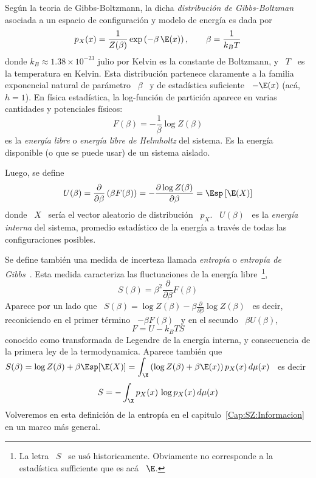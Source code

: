 \begin{ejemplo}
  Seg\'un  la  teoria  de  Gibbs-Boltzmann,  la  dicha  {\em  distribuci\'on  de
    Gibbs-Boltzman}  asociada  a  un  espacio  de configuraci\'on  y  modelo  de
  energ\'ia es dada por
  \[
  p_X(x) = \frac{1}{Z(\beta)} \exp\left( -  \beta \, \E(x) \right), \qquad \beta
  = \frac{1}{k_B T}
  \]
  donde $k_B \approx  1.38 \times 10^{-23}$ julio por Kelvin  es la constante de
  Boltzmann,  y  \ $T$  \  es la  temperatura  en  Kelvin.  Esta  distribuci\'on
  partenece claramente a la familia exponencial natural de par\'ametro \ $\beta$
  \ y  de estad\'istica  suficiente \  $-\E(x)$ (ac\'a, $h  = 1$).   En f\'isica
  estad\'istica, la log-funci\'on de  partici\'on aparece en varias cantidades y
  potenciales f\'isicos:
  \[
  F(\beta) = - \frac{1}{\beta} \log Z(\beta)
  \]
  es  la  {\em  energ\'ia  libre}  o  {\em energ\'ia  libre  de  Helmholtz}  del
  sistema.  Es la  energ\'ia disponible  (o  que se  puede usar)  de un  sistema
  aislado.

  Luego, se define
  \[
  U(\beta) =  \frac{\partial}{\partial \beta} \left( \beta F(\beta)  \right) = -
  \frac{\partial \log Z(\beta)}{\partial \beta} = \Esp\left[ \E(X) \right]
  \]
  donde  \ $X$  \ ser\'ia  el  vector aleatorio  de distribuci\'on  \ $p_X$.   \
  $U(\beta)$ \ es la {\em energ\'ia interna} del sistema, promedio estad\'istico
  de la energ\'ia a trav\'es de todas las configuraciones posibles.

  Se define  tambi\'en una medida de  incerteza llamada {\em  entrop\'ia} o {\em
    entrop\'ia  de  Gibbs}~\cite{Bol77, Bol96,  Bol98,  Gib02, Jay65,  LanLif80,
    MezMon09, Mer10,  Mer18}.  Esta medida  caracteriza las fluctuaciones  de la
  energ\'ia libre~\footnote{La letra \ $S$ \ se us\'o historicamente. Obviamente
    no corresponde a la estad\'istica sufficiente que es ac\'a \ $\E$.},
  \[
  S(\beta) = \beta^2 \frac{\partial}{\partial \beta} F(\beta)
  \]
  Aparece   por   un  lado   que   \  $S(\beta)   =   \log   Z(\beta)  -   \beta
  \frac{\partial}{\partial \beta} \log Z(\beta)$  \ es decir, reconiciendo en el
  primer t\'ermino \ $- \beta F(\beta)$ \ y en el secundo \ $\beta U(\beta)$,
  \[
  F = U - k_B T S
  \]
  conocido como transformada de Legendre de la energ\'ia interna, y consecuencia
  de la  primera ley de  la termodynamica. Aparece tambi\'en  que $\displaystyle
  S(\beta) = \log Z(\beta) + \beta  \Esp[ \E(X) ] = \int_\X \left( \log Z(\beta)
    + \beta \E(x) \right) p_X(x) \, d\mu(x)$ \ es decir
  \[
  S = - \int_\X p_X(x) \, \log p_X(x) \, d\mu(x)
  \]
  Volveremos    en    esta    definici\'on    de    la    entrop\'ia    en    el
  capitulo~\ref{Cap:SZ:Informacion} en un marco m\'as general.
\end{ejemplo}


